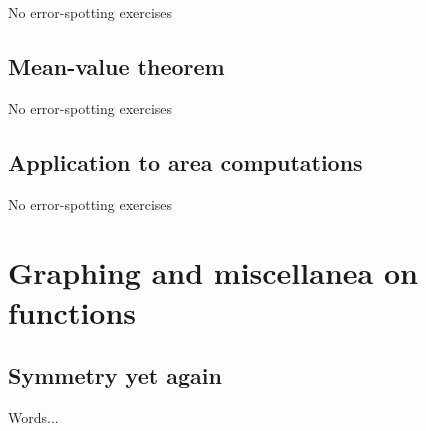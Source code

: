 \documentclass[10pt]{amsart}
\begin{document}
No error-spotting exercises

\subsection{Mean-value theorem}

No error-spotting exercises

\subsection{Application to area computations}

No error-spotting exercises

\section{Graphing and miscellanea on functions}

\subsection{Symmetry yet again}

Words...
\end{document}
